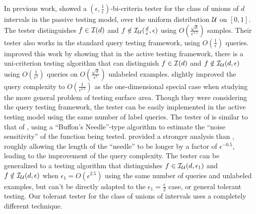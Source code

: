 In previous work, \citet{KR98} showed a $(\epsilon,\frac 1\epsilon)$-bi-criteria tester for the class of unions of $d$ intervals in the passive testing model, over the uniform distribution ${\mathcal{U}}$ on $[0,1]$. The tester distinguishes $f\in{\mathcal{I}(d)}$ and $f\notin\mathcal{I}_{{\mathcal{U}}}(\frac{d}{\epsilon},\epsilon)$ using $O(\frac{\sqrt d}{\epsilon^{1.5}})$ samples. Their tester also works in the standard query testing framework, using $O(\frac{1}{\epsilon})$ queries. %
\citet{BBBY12} improved this work by showing that in the active testing framework, there is a uni-criterion testing algorithm that can distinguish $f\in{\mathcal{I}}(d)$ and $f\notin\mathcal{I}_{\mathcal{U}}(d,\epsilon)$ using $O(\frac{1}{\epsilon^4})$ queries on $O(\frac{\sqrt{d}}{\epsilon^5})$ unlabeled examples. \citet{KNOW13} slightly improved the query complexity to $O(\frac{1}{\epsilon^{3.5}})$ as the one-dimensional special case when studying the more general problem of testing surface area. Though they were considering the query testing framework, the tester can be easily implemented in the active testing model using the same number of label queries. The tester of  \citet{KNOW13} is similar to that of \citet{BBBY12}, using a ``Buffon's Needle''-type algorithm to estimate the ``noise sensitivity'' of the function being tested. \citet{KNOW13} provided a stronger analysis than \citet{BBBY12}, roughly allowing the length of the ``needle'' to be longer by a factor of $\epsilon^{-0.5}$, leading to the improvement of the query complexity. The tester can be generalized to a testing algorithm that distinguishes $f\in\mathcal{I}_{\mathcal{U}}(d,\epsilon_1)$ and $f\notin\mathcal{I}_{\mathcal{U}}(d,\epsilon)$ when $\epsilon_1=O(\epsilon^{2.5})$ using the same number of queries and unlabeled examples, but can't be directly adapted to the $\epsilon_1=\frac\epsilon 2$ case, or general tolerant testing. Our tolerant tester for the class of unions of intervals uses a completely different technique.

